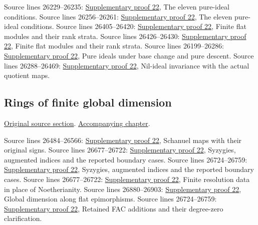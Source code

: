 \begin{AlgebraSourceRoutes}
 Source lines 26229--26235: \hyperlink{algebra_pure_global_notes_20260928}{Supplementary proof 22}, The eleven pure-ideal conditions.
 Source lines 26256--26261: \hyperlink{algebra_pure_global_notes_20260928}{Supplementary proof 22}, The eleven pure-ideal conditions.
 Source lines 26405--26420: \hyperlink{algebra_pure_global_notes_20260928}{Supplementary proof 22}, Finite flat modules and their rank strata.
 Source lines 26426--26430: \hyperlink{algebra_pure_global_notes_20260928}{Supplementary proof 22}, Finite flat modules and their rank strata.
 Source lines 26199--26286: \hyperlink{algebra_pure_global_notes_20260928}{Supplementary proof 22}, Pure ideals under base change and pure descent.
 Source lines 26288--26469: \hyperlink{algebra_pure_global_notes_20260928}{Supplementary proof 22}, Nil-ideal invariance with the actual quotient maps.
\end{AlgebraSourceRoutes}

\subsection{Rings of finite global dimension}
\hypertarget{algebra-source-section-ring-finite-gl-dim}{}
\noindent\href{https://github.com/stacks/stacks-project/blob/a04446e57ec1fbc252a871afcec7752fb2807b14/algebra.tex\#L26477}{Original source section}. \href{algebra.pdf\#nameddest=section-ring-finite-gl-dim}{Accompanying chapter}.

\begin{AlgebraSourceRoutes}
 Source lines 26484--26566: \hyperlink{algebra_pure_global_notes_20260928}{Supplementary proof 22}, Schanuel maps with their original signs.
 Source lines 26677--26722: \hyperlink{algebra_pure_global_notes_20260928}{Supplementary proof 22}, Syzygies, augmented indices and the reported boundary cases.
 Source lines 26724--26759: \hyperlink{algebra_pure_global_notes_20260928}{Supplementary proof 22}, Syzygies, augmented indices and the reported boundary cases.
 Source lines 26677--26722: \hyperlink{algebra_pure_global_notes_20260928}{Supplementary proof 22}, Finite resolution data in place of Noetherianity.
 Source lines 26880--26903: \hyperlink{algebra_pure_global_notes_20260928}{Supplementary proof 22}, Global dimension along flat epimorphisms.
 Source lines 26724--26759: \hyperlink{algebra_pure_global_notes_20260928}{Supplementary proof 22}, Retained FAC additions and their degree-zero clarification.
\end{AlgebraSourceRoutes}

